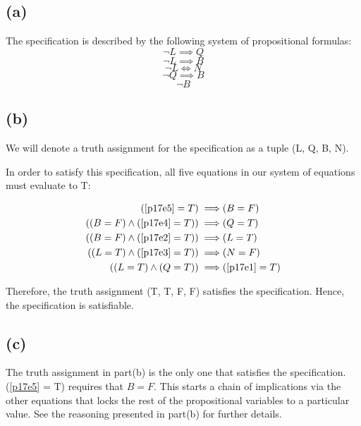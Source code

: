 \documentclass{article}
\begin{document}
\subsection{(a)}
The specification is described by the following system of propositional formulas:
\begin{equation}
	\label{p17e1}
	\neg L \implies Q
\end{equation}
\begin{equation}
	\label{p17e2}
	\neg L \implies B
\end{equation}
\begin{equation}
	\label{p17e3}
	\neg L \iff N
\end{equation}
\begin{equation}
	\label{p17e4}
	\neg Q \implies B
\end{equation}
\begin{equation}
	\label{p17e5}
	\neg B
\end{equation}
\subsection{(b)}
We will denote a truth assignment for the specification as a tuple (L, Q, B, N).

In order to satisfy this specification, all five equations in our system of equations must evaluate to T:

\begin{align*}
	(\eqref{p17e5} = T) \implies                 & (B = F)             \\
	((B = F) \land (\eqref{p17e4} = T)) \implies & (Q = T)             \\
	((B = F) \land (\eqref{p17e2} = T)) \implies & (L = T)             \\
	((L = T) \land (\eqref{p17e3} = T)) \implies & (N = F)             \\
	((L = T) \land (Q = T)) \implies             & (\eqref{p17e1} = T)
\end{align*}

Therefore, the truth assignment (T, T, F, F) satisfies the specification. Hence, the specification is satisfiable.

\subsection{(c)}
The truth assignment in part(b) is the only one that satisfies the specification. (\eqref{p17e5} = T) requires that $B = F$. This starts a chain of implications via the other equations that locks the rest of the propositional variables to a particular value. See the reasoning presented in part(b) for further details.
\end{document}
